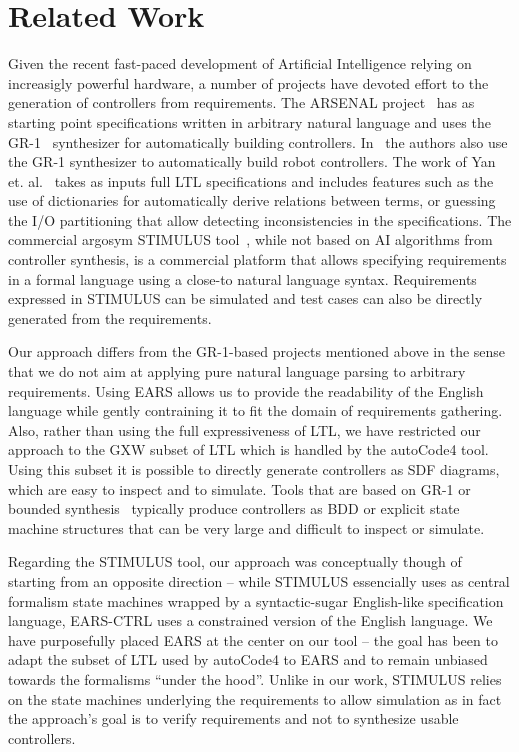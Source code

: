 \section{Related Work}
\vspace{-.4cm}Given the recent fast-paced development of Artificial Intelligence
relying on increasigly powerful hardware, a number of projects have devoted effort to the
generation of controllers from requirements. The ARSENAL
project~\cite{ghosh2016arsenal} has as starting point specifications written in
arbitrary natural language and uses the GR-1~\cite{piterman2006synthesis}
synthesizer for automatically building controllers. In~\cite{YanCC15} the
authors also use the GR-1 synthesizer to automatically build robot
controllers. The work of Yan et. al.~\cite{YanCC15} takes as inputs full LTL
specifications and includes features such as the use of dictionaries for
automatically derive relations between terms, or guessing the I/O partitioning
that allow detecting inconsistencies in the specifications. The commercial
argosym STIMULUS tool~\cite{jeannet16}, while not based on AI algorithms from controller
synthesis, is a commercial platform that allows specifying requirements in a
formal language using a close-to natural language syntax. Requirements expressed
in STIMULUS can be simulated and test cases can also be directly generated from
the requirements.

Our approach differs from the GR-1-based projects mentioned above in the sense
that we do not aim at applying pure natural language parsing to arbitrary
requirements. Using EARS allows us to provide the readability of the English
language while gently contraining it to fit the domain of requirements
gathering. Also, rather than using the full expressiveness of LTL, we have
restricted our approach to the \textsf{GXW} subset of LTL which is handled by
the \textsf{autoCode4} tool. Using this subset it is possible to directly
generate controllers as SDF diagrams, which are easy to inspect and to simulate.
Tools that are based on GR-1 or bounded synthesis~\cite{schewe2007bounded}
typically produce controllers as BDD or explicit state machine structures that
can be very large and difficult to inspect or simulate.

Regarding the STIMULUS tool, our approach was conceptually though of starting
from an opposite direction -- while STIMULUS essencially uses as central
formalism state machines wrapped by a syntactic-sugar English-like specification
language, \textsf{EARS-CTRL} uses a constrained version of the English language.
We have purposefully placed EARS at the center on our tool -- the goal has been
to adapt the subset of LTL used by \textsf{autoCode4} to EARS and to remain
unbiased towards the formalisms ``under the hood''. Unlike in our work, STIMULUS
relies on the state machines underlying the requirements to allow simulation as
in fact the approach's goal is to verify requirements and not to synthesize
usable controllers.\vspace{-.5cm}

